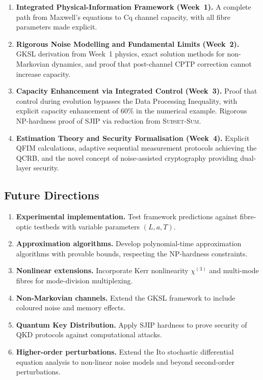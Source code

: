 \documentclass[journal,twocolumn]{IEEEtran}
\theoremstyle{definition}
\theoremstyle{plain}
\begin{document}
\begin{enumerate}[leftmargin=*, label=(\arabic*), itemsep=2pt]
  \item \textbf{Integrated Physical-Information Framework (Week~1).}
    A complete path from Maxwell's equations to Cq channel capacity,
    with all fibre parameters made explicit.
  \item \textbf{Rigorous Noise Modelling and Fundamental Limits
    (Week~2).} GKSL derivation from Week~1 physics, exact solution
    methods for non-Markovian dynamics, and proof that post-channel CPTP
    correction cannot increase capacity.
  \item \textbf{Capacity Enhancement via Integrated Control (Week~3).}
    Proof that control during evolution bypasses the Data Processing
    Inequality, with explicit capacity enhancement of 60\% in the
    numerical example. Rigorous NP-hardness proof of SJIP via reduction
    from \textsc{Subset-Sum}.
  \item \textbf{Estimation Theory and Security Formalisation (Week~4).}
    Explicit QFIM calculations, adaptive sequential measurement
    protocols achieving the QCRB, and the novel concept of
    noise-assisted cryptography providing dual-layer security.
\end{enumerate}

\subsection{Future Directions}

\begin{enumerate}[leftmargin=*, label=(\arabic*), itemsep=2pt]
  \item \textbf{Experimental implementation.} Test framework predictions
    against fibre-optic testbeds with variable parameters $(L,a,T)$.
  \item \textbf{Approximation algorithms.} Develop polynomial-time
    approximation algorithms with provable bounds, respecting the
    NP-hardness constraints.
  \item \textbf{Nonlinear extensions.} Incorporate Kerr nonlinearity
    $\chi^{(3)}$ and multi-mode fibres for mode-division multiplexing.
  \item \textbf{Non-Markovian channels.} Extend the GKSL framework to
    include coloured noise and memory effects.
  \item \textbf{Quantum Key Distribution.} Apply SJIP hardness to prove
    security of QKD protocols against computational attacks.
  \item \textbf{Higher-order perturbations.} Extend the Ito stochastic
    differential equation analysis to non-linear noise models and beyond
    second-order perturbations.
\end{enumerate}
\end{document}
